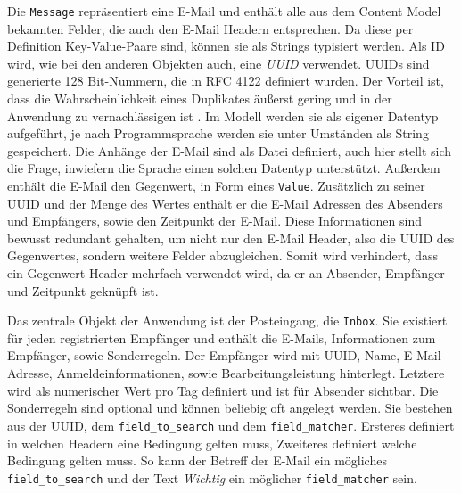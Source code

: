 Die \texttt{Message} repräsentiert eine E-Mail und enthält alle aus dem Content Model bekannten Felder, die auch den E-Mail Headern entsprechen. Da diese per Definition Key-Value-Paare sind, können sie als Strings typisiert werden. Als ID wird, wie bei den anderen Objekten auch, eine \textit{UUID} verwendet. UUIDs sind generierte 128 Bit-Nummern, die in RFC 4122 definiert wurden. Der Vorteil ist, dass die Wahrscheinlichkeit eines Duplikates äußerst gering und in der Anwendung zu vernachlässigen ist \citep[S. 2]{RFC4122}. Im Modell werden sie als eigener Datentyp aufgeführt, je nach Programmsprache werden sie unter Umständen als String gespeichert. Die Anhänge der E-Mail sind als Datei definiert, auch hier stellt sich die Frage, inwiefern die Sprache einen solchen Datentyp unterstützt. Außerdem enthält die E-Mail den Gegenwert, in Form eines \texttt{Value}. Zusätzlich zu seiner UUID und der Menge des Wertes enthält er die E-Mail Adressen des Absenders und Empfängers, sowie den Zeitpunkt der E-Mail. Diese Informationen sind bewusst redundant gehalten, um nicht nur den E-Mail Header, also die UUID des Gegenwertes, sondern weitere Felder abzugleichen. Somit wird verhindert, dass ein Gegenwert-Header mehrfach verwendet wird, da er an Absender, Empfänger und Zeitpunkt geknüpft ist.

Das zentrale Objekt der Anwendung ist der Posteingang, die \texttt{Inbox}. Sie existiert für jeden registrierten Empfänger und enthält die E-Mails, Informationen zum Empfänger, sowie Sonderregeln. Der Empfänger wird mit UUID, Name, E-Mail Adresse, Anmeldeinformationen, sowie Bearbeitungsleistung hinterlegt. Letztere wird als numerischer Wert pro Tag definiert und ist für Absender sichtbar. Die Sonderregeln sind optional und können beliebig oft angelegt werden. Sie bestehen aus der UUID, dem \texttt{field\_to\_search} und dem \texttt{field\_matcher}. Ersteres definiert in welchen Headern eine Bedingung gelten muss, Zweiteres definiert welche Bedingung gelten muss. So kann der Betreff der E-Mail ein mögliches \texttt{field\_to\_search} und der Text \textit{Wichtig} ein möglicher \texttt{field\_matcher} sein.

